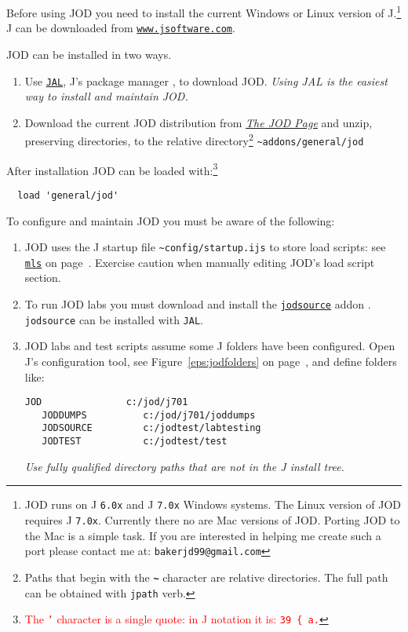 Before using JOD you need to install the current Windows or Linux version of J.\footnote{JOD runs on 
 J \texttt{6.0x} and  J \texttt{7.0x} Windows systems. The Linux version of JOD requires J
\texttt{7.0x}. Currently there no are Mac versions of JOD. Porting JOD to the Mac is a simple task.
If you are interested in helping me create such a port please contact me at:  
\texttt{bakerjd99@gmail.com}
} J can be downloaded from \href{http://www.jsoftware.com}{\texttt{www.jsoftware.com}}.

JOD can be installed in two ways.  
\begin{enumerate}
	\item Use \href{http://202.67.223.49/jwiki/Addons/general/jod}{\texttt{JAL}}, J's package manager 
	\cite{jwiki:jal}, to download JOD. \emph{Using JAL is the easiest way to install and maintain JOD.}
	\item Download the current JOD distribution from \href{http://bakerjd99.wordpress.com/the-jod-page/}{\emph{The JOD Page}} \cite{baker:jodpages} and unzip, preserving directories, to the relative directory\footnote{Paths that begin with the \textbf{\texttt{\~}} character are relative directories. The full path can be obtained with \texttt{jpath} verb. } \verb|~addons/general/jod|
\end{enumerate}

After installation JOD can be loaded with:\footnote{
\textcolor{red}{The \texttt{'} character is a single quote: in J notation it is: \texttt{39 \{ a.}}
}
\begin{verbatim}
  load 'general/jod'
\end{verbatim}

To configure and maintain JOD you must be aware of the following:
\begin{enumerate}
	\item JOD uses the J startup file \verb|~config/startup.ijs| to store load scripts: see 
	\hyperlink{il:mls}{\texttt{mls}} on page~\pageref{ss:mls}.  Exercise caution when manually
	editing JOD's load script section.
	\item To run JOD labs you must download and install the
	 \href{http://www.jsoftware.com/jwiki/Addons/general/jodsource}{\texttt{jodsource}} addon \cite{baker:jodsource}. 
	 \texttt{jodsource} can be installed with \texttt{JAL}.
	\item JOD labs and test scripts assume some J folders have been configured.  Open J's
	configuration tool, see Figure~\ref{eps:jodfolders} on 
   page~\pageref{eps:jodfolders}, and
	define folders like:
	\begin{lstlisting}[frame=single,framerule=0pt,label=lst:foldercfg]
   JOD               c:/jod/j701
   JODDUMPS          c:/jod/j701/joddumps
   JODSOURCE         c:/jodtest/labtesting
   JODTEST           c:/jodtest/test
  \end{lstlisting}
  \emph{Use fully qualified directory paths that are not in the J install tree.}
\end{enumerate} 


